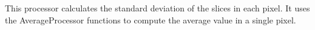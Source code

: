 This processor calculates the standard deviation of the slices in each pixel. It uses
the {\ttfamily AverageProcessor} functions to compute the average value in a single
pixel.